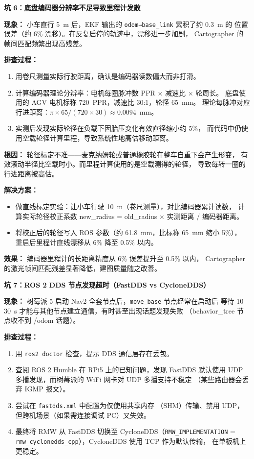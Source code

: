 \documentclass[11pt,a4paper]{article}
\begin{document}
\vspace{2em}

\textbf{坑 6：底盘编码器分辨率不足导致里程计发散}

\textbf{现象：}
小车直行 5~m 后，EKF 输出的 \texttt{odom→base\_link} 累积了约 0.3~m 的
位置误差（约 6\% 漂移）。在反复启停的轨迹中，漂移进一步加剧，
Cartographer 的帧间匹配频繁出现高残差。

\textbf{排查过程：}
\begin{enumerate}
  \item 用卷尺测量实际行驶距离，确认是编码器读数偏大而非打滑。
  \item 计算编码器理论分辨率：电机每圈脉冲数 PPR × 减速比 × 轮周长。
        底盘使用的 AGV 电机标称 720~PPR，减速比 30:1，轮径 65~mm。
        理论每脉冲对应行进距离：$\pi \times 65 / (720 \times 30) \approx 0.0094$~mm。
  \item 实测后发现实际轮径在负载下因胎压变化有效直径缩小约 5\%，
        而代码中仍使用空载轮径计算里程，导致系统性地高估移动距离。
\end{enumerate}

\textbf{根因：}
轮径标定不准——麦克纳姆轮或普通橡胶轮在整车自重下会产生形变，
有效滚动半径比空载时小。而里程计算使用的是空载测得的轮径，
导致每转一圈的行进距离被高估。

\textbf{解决方案：}
\begin{itemize}
  \item 做直线标定实验：让小车行驶 10~m（卷尺测量），对比编码器累计读数，
        计算实际轮径校正系数 new\_radius = old\_radius × 实测距离 / 编码器距离。
  \item 将校正后的轮径写入 ROS 参数（约 61.8~mm，比标称 65~mm 缩小 5\%），
        重启后里程计直线漂移从 6\% 降至 0.5\% 以内。
\end{itemize}

\textbf{效果：}
编码器里程计的长距离精度从 6\% 误差提升至 0.5\% 以内，
Cartographer 的激光帧间匹配残差显著降低，建图质量随之改善。

\vspace{2em}

\textbf{坑 7：ROS 2 DDS 节点发现超时（FastDDS vs CycloneDDS）}

\textbf{现象：}
树莓派 5 启动 Nav2 全套节点后，\texttt{move\_base} 节点经常在启动后
等待 10--30~s 才能与其他节点建立通信，有时甚至出现话题发现失败
（behavior\_tree 节点收不到 /odom 话题）。

\textbf{排查过程：}
\begin{enumerate}
  \item 用 \texttt{ros2 doctor} 检查，提示 DDS 通信层存在丢包。
  \item 查阅 ROS 2 Humble 在 RPi5 上的已知问题，发现 FastDDS 默认使用
        UDP 多播发现，而树莓派的 WiFi 网卡对 UDP 多播支持不稳定
        （某些路由器会丢弃 IGMP 报文）。
  \item 尝试在 \texttt{fastdds.xml} 中配置为仅使用共享内存
        （SHM）传输、禁用 UDP，但跨机场景（如果需连接调试 PC）又失效。
  \item 最终将 RMW 从 FastDDS 切换至 CycloneDDS（\texttt{RMW\_IMPLEMENTATION}
        = \texttt{rmw\_cyclonedds\_cpp}），CycloneDDS 使用 TCP 作为默认传输，
        在单板机上更稳定。
\end{enumerate}
\end{document}
